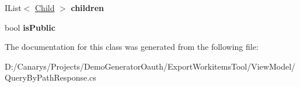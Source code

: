 \begin{DoxyCompactItemize}
I\+List$<$ \mbox{\hyperlink{class_templates_generator_tool_1_1_view_model_1_1_query_by_path_response_1_1_child}{Child}} $>$ {\bfseries children}
\item 
\mbox{\label{class_templates_generator_tool_1_1_view_model_1_1_query_by_path_response_1_1query_af6d3dd82b0cbbaee83b38f67151e6bcb}} 
bool {\bfseries is\+Public}
\end{DoxyCompactItemize}


The documentation for this class was generated from the following file\+:\begin{DoxyCompactItemize}
\item 
D\+:/\+Canarys/\+Projects/\+Demo\+Generator\+Oauth/\+Export\+Workitems\+Tool/\+View\+Model/Query\+By\+Path\+Response.\+cs\end{DoxyCompactItemize}
